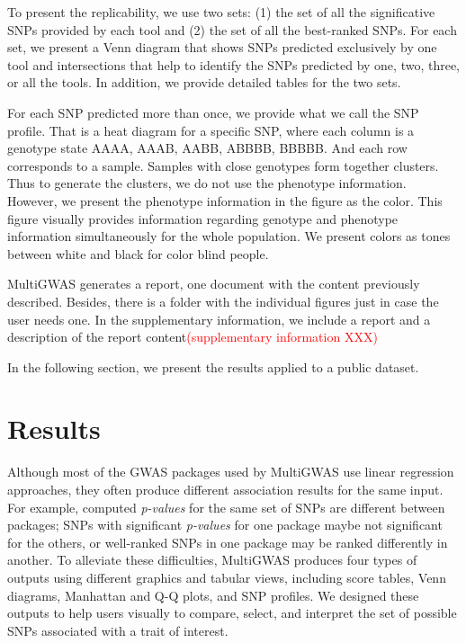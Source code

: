 \documentclass{article}
\begin{document}
To present the replicability, we use two sets: (1) the set of all the significative SNPs provided by each tool and (2) the set of all the best-ranked SNPs. For each set, we present a Venn diagram that shows SNPs predicted exclusively by one tool and intersections that help to identify the SNPs predicted by one, two, three, or all the tools. In addition, we provide detailed tables for the two sets.

For each SNP predicted more than once, we provide what we call the SNP profile. That is a heat diagram for a specific SNP, where each column is a genotype state AAAA, AAAB, AABB, ABBBB, BBBBB. And each row corresponds to a sample. Samples with close genotypes form together clusters. Thus to generate the clusters, we do not use the phenotype information. However, we present the phenotype information in the figure as the color. This figure visually provides information regarding genotype and phenotype information simultaneously for the whole population. We present colors as tones between white and black for color blind people. 


MultiGWAS generates a report, one document with the content previously described. Besides, there is a folder with the individual figures just in case the user needs one. In the supplementary information, we include a report and a description of the report content\textcolor{red}{(supplementary information XXX)}


In the following section, we present the results applied to a public dataset. 





\section{Results}

Although most of the GWAS packages used by MultiGWAS use linear regression approaches, they often produce different association results for the same input. For example, computed \emph{p-values }for the same set of SNPs are different between packages; SNPs with significant \emph{p-values} for one package maybe not significant for the others, or well-ranked SNPs in one package may be ranked differently in another. To alleviate these difficulties, MultiGWAS produces four types of outputs using different graphics and tabular views, including score tables, Venn diagrams, Manhattan and Q-Q plots, and SNP profiles. We designed these outputs to help users visually to compare, select, and interpret the set of possible SNPs associated with a trait of interest. 
\end{document}

